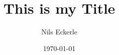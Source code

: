 

\newcommand*\lxor{\ \dot{\vee}}
\newcommand{\nLeftright}{\mathrel{\ooalign{$\Leftrightarrow$\cr\hidewidth$/$\hidewidth}}}
\newcommand{\nleftright}{\mathrel{\ooalign{$\leftrightarrow$\cr\hidewidth$/$\hidewidth}}}

\title{\vspace{-3.5cm}\huge \bf This is my Title}
\author{\vspace{-3mm}Nils Eckerle}
\date{\vspace{-6mm}\small\today}




\maketitle
\tableofcontents
\newpage




